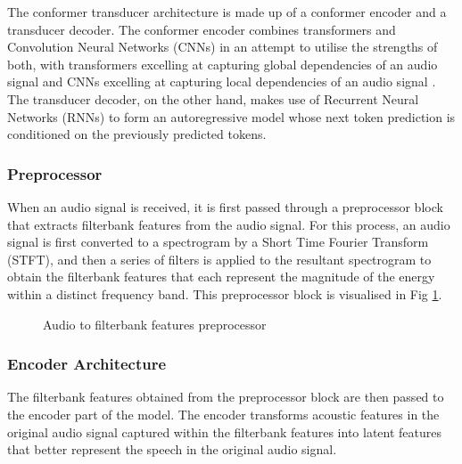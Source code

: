 \documentclass{CSSRforAfrica}
\begin{document}
The conformer transducer architecture is made up of a conformer encoder and a transducer decoder. The conformer encoder combines transformers and Convolution Neural Networks (CNNs) in an attempt to utilise the strengths of both, with transformers excelling at capturing global dependencies of an audio signal and CNNs excelling at capturing local dependencies of an audio signal \cite{gulati_conformer_2020}. The transducer decoder, on the other hand, makes use of Recurrent Neural Networks (RNNs) to form an autoregressive model whose next token prediction is conditioned on the previously predicted tokens.

\subsubsection{Preprocessor}
When an audio signal is received, it is first passed through a preprocessor block that extracts filterbank features from the audio signal. For this process, an audio signal is first converted to a spectrogram by a Short Time Fourier Transform (STFT), and then a series of filters is applied to the resultant spectrogram to obtain the filterbank features that each represent the magnitude of the energy within a distinct frequency band. This preprocessor block is visualised in Fig \ref{fig:preprocessor}.

\begin{figure}[thb]
\begin{center}
\end{center}
\caption{Audio to filterbank features preprocessor}
\label{fig:preprocessor}
\end{figure}

\subsubsection{Encoder Architecture}
The filterbank features obtained from the preprocessor block are then passed to the encoder part of the model. The encoder transforms acoustic features in the original audio signal captured within the filterbank features into latent features that better represent the speech in the original audio signal.
\end{document}
